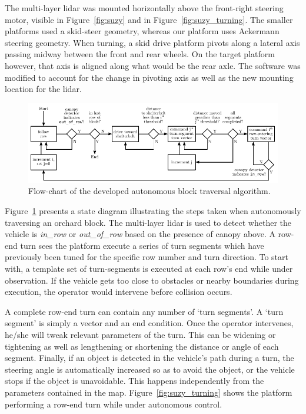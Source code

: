 \documentclass[preprint,authoryear,12pt]{elsarticle}
\begin{document}
    The multi-layer lidar was mounted horizontally above the front-right steering motor, visible in Figure~\ref{fig:suzy} and in Figure~\ref{fig:suzy_turning}.
    The smaller platforms used a skid-steer geometry, whereas our platform uses Ackermann steering geometry.
    When turning, a skid drive platform pivots along a lateral axis passing midway between the front and rear wheels.
    On the target platform however, that axis is aligned along what would be the rear axle.
    The software was modified to account for the change in pivoting axis as well as the new mounting location for the lidar.

    \begin{figure}[htb]
        \centering
        \includegraphics[width=\linewidth]{imgs/turning_diagrams/flowchart.pdf}
        \caption{
            Flow-chart of the developed autonomous block traversal algorithm.
        }
        \label{fig:turn_diagram}
    \end{figure}

    Figure~\ref{fig:turn_diagram} presents a state diagram illustrating the steps taken when autonomously traversing an orchard block.
    The multi-layer lidar is used to detect whether the vehicle is \textit{in\_row} or \textit{out\_of\_row} based on the presence of canopy above.
    A row-end turn sees the platform execute a series of turn segments which have previously been tuned for the specific row number and turn direction.
    To start with, a template set of turn-segments is executed at each row's end while under observation.
    If the vehicle gets too close to obstacles or nearby boundaries during execution, the operator would intervene before collision occurs.

    A complete row-end turn can contain any number of `turn segments'.
    A `turn segment' is simply a vector and an end condition.
    Once the operator intervenes, he/she will tweak relevant parameters of the turn.
    This can be widening or tightening as well as lengthening or shortening the distance or angle of each segment.
    Finally, if an object is detected in the vehicle's path during a turn, the steering angle is automatically increased so as to avoid the object, or the vehicle stops if the object is unavoidable.
    This happens independently from the parameters contained in the map.
    Figure~\ref{fig:suzy_turning} shows the platform performing a row-end turn while under autonomous control.
\end{document}
